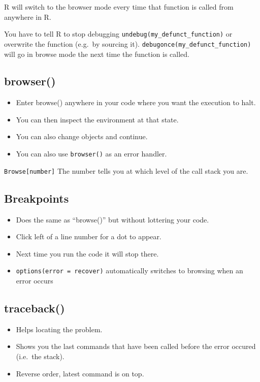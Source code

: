 \documentclass[]{book}
\providecommand{\tightlist}{%
  \setlength{\itemsep}{0pt}\setlength{\parskip}{0pt}}
\begin{document}
R will switch to the browser mode every time that function is called from anywhere in R.

You have to tell R to stop debugging \texttt{undebug(my\_defunct\_function)} or overwrite the function (e.g.~by sourcing it).
\texttt{debugonce(my\_defunct\_function)} will go in browse mode the next time the function is called.

\hypertarget{browser}{%
\subsection{browser()}\label{browser}}

\begin{itemize}
\tightlist
\item
  Enter browse() anywhere in your code where you want the execution to halt.
\item
  You can then inspect the environment at that state.
\item
  You can also change objects and continue.
\item
  You can also use \texttt{browser()} as an error handler.
\end{itemize}

\texttt{Browse{[}number{]}} The number tells you at which level of the call stack you are.

\hypertarget{breakpoints}{%
\subsection{Breakpoints}\label{breakpoints}}

\begin{itemize}
\tightlist
\item
  Does the same as ``browse()'' but without lottering your code.
\item
  Click left of a line number for a dot to appear.
\item
  Next time you run the code it will stop there.
\item
  \texttt{options(error\ =\ recover)} automatically switches to browsing when an error occurs
\end{itemize}

\hypertarget{traceback}{%
\subsection{traceback()}\label{traceback}}

\begin{itemize}
\tightlist
\item
  Helps locating the problem.
\item
  Shows you the last commands that have been called before the error occured (i.e.~the stack).
\item
  Reverse order, latest command is on top.
\end{itemize}
\end{document}
